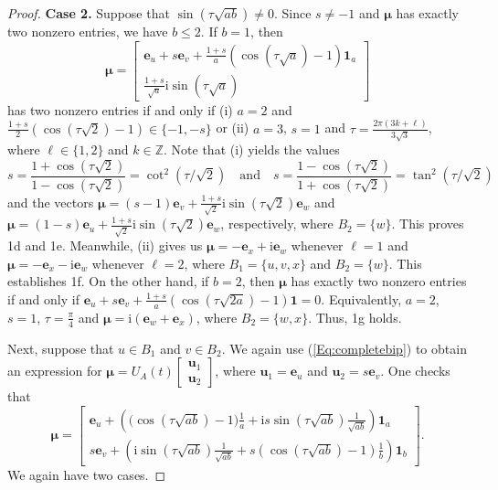 \documentclass{article}
\numberwithin{equation}{section}
\newcommand{\uno}{\mathbf 1}
\newcommand{\be}{\mathbf e}
\newcommand{\bu}{\mathbf u}
\newcommand{\bmu}{{\boldsymbol{\mu}}}
\def\Z{\mathbb{Z}}
\def\ii{\mathrm{i}}
\begin{document}
{\begin{proof}
\noindent \textbf{Case 2.} Suppose that $\sin( \tau\sqrt{ab})\neq 0$. Since $s\neq -1$ and $\bmu$ has exactly two nonzero entries, we have $b\leq 2$. If $b=1$, then
\begin{equation*}
\bmu=\begin{bmatrix}
\be_u+s\be_v+\frac{1+s}{a}(\cos(\tau\sqrt{a})-1)\uno_a \\ \frac{1+s}{\sqrt{a}}\ii\sin(\tau\sqrt{a})
\end{bmatrix}
\end{equation*}
has two nonzero entries if and only if (i) $a=2$ and $\frac{1+s}{2}(\cos(\tau\sqrt{2})-1)\in\{-1,-s\}$ or (ii) $a=3$, $s=1$ and $\tau=\frac{2\pi(3k+\ell)}{3\sqrt{3}}$, where $\ell\in\{1,2\}$ and $k\in\Z$. Note that (i) yields the values 
\begin{equation*}
s=\dfrac{1+\cos(\tau\sqrt{2})}{1-\cos(\tau\sqrt{2})}=\cot^2(\tau/\sqrt{2})\quad  \text{and} \quad s=\dfrac{1-\cos(\tau\sqrt{2})}{1+\cos(\tau\sqrt{2})}=\tan^2(\tau/\sqrt{2})
\end{equation*}
and the vectors $\bmu=(s-1)\be_v+\frac{1+s}{\sqrt{2}}\ii\sin(\tau\sqrt{2})\be_w$ and $\bmu=(1-s)\be_u+\frac{1+s}{\sqrt{2}}\ii\sin(\tau\sqrt{2})\be_w$,
respectively, where $B_2=\{w\}$. This proves 1d and 1e. Meanwhile, (ii) gives us $\bmu=-\be_x+\ii\be_w$ whenever $\ell=1$ and $\bmu=-\be_x-\ii\be_w$ whenever $\ell=2$, where $B_1=\{u,v,x\}$ and $B_2=\{w\}$. This establishes 1f. On the other hand, if $b=2$, then $\bmu$ has exactly two nonzero entries if and only if $\be_u+s\be_v+\frac{1+s}{a}(\cos(\tau\sqrt{2a})-1)\uno=0$. Equivalently, $a=2$, $s=1$, $\tau=\frac{\pi}{4}$ and $\bmu=\ii (\be_w+\be_x)$, where $B_2=\{w,x\}$. Thus, 1g holds.

Next, suppose that $u\in B_1$ and $v\in B_2$. We again use (\ref{Eq:completebip}) to obtain an expression for $\bmu=U_A(t)\begin{bmatrix}
\bu_1\\ \bu_2\end{bmatrix}$, where $\bu_1=\be_u$ and $\bu_2=s\be_v$. One checks that
\begin{equation}
\label{Eq:pf}
\bmu=\begin{bmatrix}
\be_u+\left(\big(\cos( \tau\sqrt{ab})-1\big)\frac{1}{a}+\ii s\sin(\tau\sqrt{ab})\frac{1}{\sqrt{ab}}\right)\uno_a \\ s\be_v+\left(\ii\sin(\tau\sqrt{ab})\frac{1}{\sqrt{ab}}+s(\cos(\tau\sqrt{ab})-1)\frac{1}{b}\right)\uno_b
\end{bmatrix}. 
\end{equation}
We again have two cases.


\end{proof}}
\end{document}
